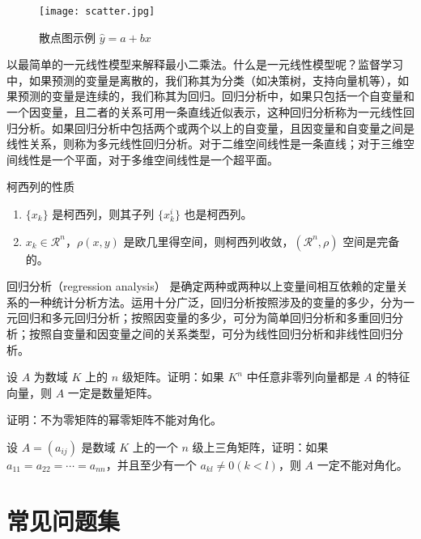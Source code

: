 \documentclass[lang=cn,newtx,10pt,scheme=chinese,color=black]{elegantbook}
\begin{document}
\begin{figure}[htbp]
  \centering
  \texttt{[image: scatter.jpg]}
  \caption{散点图示例 $\hat{y}=a+bx$ \label{fig:scatter}}
\end{figure}

以最简单的一元线性模型来解释最小二乘法。什么是一元线性模型呢？监督学习中，如果预测的变量是离散的，我们称其为分类（如决策树，支持向量机等），如果预测的变量是连续的，我们称其为回归。回归分析中，如果只包括一个自变量和一个因变量，且二者的关系可用一条直线近似表示，这种回归分析称为一元线性回归分析。如果回归分析中包括两个或两个以上的自变量，且因变量和自变量之间是线性关系，则称为多元线性回归分析。对于二维空间线性是一条直线；对于三维空间线性是一个平面，对于多维空间线性是一个超平面。

\begin{property}\label{property:cauchy}
柯西列的性质
\begin{enumerate}
\item $\{x_k\}$ 是柯西列，则其子列 $\{x_k^i\}$ 也是柯西列。
\item $x_k\in \mathcal{R}^n$，$\rho(x,y)$ 是欧几里得空间，则柯西列收敛，$(\mathcal{R}^n,\rho)$ 空间是完备的。
\end{enumerate}
\end{property}

\begin{conclusion}
回归分析（regression analysis） 是确定两种或两种以上变量间相互依赖的定量关系的一种统计分析方法。运用十分广泛，回归分析按照涉及的变量的多少，分为一元回归和多元回归分析；按照因变量的多少，可分为简单回归分析和多重回归分析；按照自变量和因变量之间的关系类型，可分为线性回归分析和非线性回归分析。
\end{conclusion}

\begin{problemset}
\item 设 $A$ 为数域 $K$ 上的 $n$ 级矩阵。证明：如果 $K^n$ 中任意非零列向量都是 $A$ 的特征向量，则 $A$ 一定是数量矩阵。
\item 证明：不为零矩阵的幂零矩阵不能对角化。
\item 设 $A = (a_{ij})$ 是数域 $K$ 上的一个 $n$ 级上三角矩阵，证明：如果 $a_{11} = a_{22} = \cdots = a_{nn}$，并且至少有一个 $a_{kl} \not = 0 (k < l)$，则 $A$ 一定不能对角化。
\end{problemset}

\chapter{常见问题集}
\end{document}
